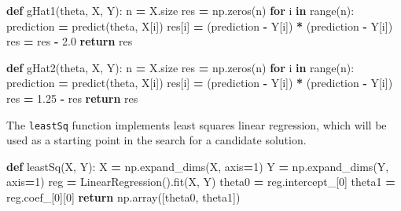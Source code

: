 \documentclass[12pt, twoside]{amherstthesis}
\newenvironment{Shaded}{\begin{snugshade}}{\end{snugshade}}
\newcommand{\BuiltInTok}[1]{#1}
\newcommand{\ControlFlowTok}[1]{\textcolor[rgb]{0.13,0.29,0.53}{\textbf{#1}}}
\newcommand{\DecValTok}[1]{\textcolor[rgb]{0.00,0.00,0.81}{#1}}
\newcommand{\FloatTok}[1]{\textcolor[rgb]{0.00,0.00,0.81}{#1}}
\newcommand{\KeywordTok}[1]{\textcolor[rgb]{0.13,0.29,0.53}{\textbf{#1}}}
\newcommand{\NormalTok}[1]{#1}
\newcommand{\OperatorTok}[1]{\textcolor[rgb]{0.81,0.36,0.00}{\textbf{#1}}}
\begin{document}
\begin{Shaded}
\begin{Highlighting}[]
\KeywordTok{def}\NormalTok{ gHat1(theta, X, Y):}
\NormalTok{    n }\OperatorTok{=}\NormalTok{ X.size          }
\NormalTok{    res }\OperatorTok{=}\NormalTok{ np.zeros(n)   }
    \ControlFlowTok{for}\NormalTok{ i }\KeywordTok{in} \BuiltInTok{range}\NormalTok{(n):}
\NormalTok{        prediction }\OperatorTok{=}\NormalTok{ predict(theta, X[i])                   }
\NormalTok{        res[i] }\OperatorTok{=}\NormalTok{ (prediction }\OperatorTok{{-}}\NormalTok{ Y[i]) }\OperatorTok{*}\NormalTok{ (prediction }\OperatorTok{{-}}\NormalTok{ Y[i])  }
\NormalTok{    res }\OperatorTok{=}\NormalTok{ res }\OperatorTok{{-}} \FloatTok{2.0}     
    \ControlFlowTok{return}\NormalTok{ res}

\KeywordTok{def}\NormalTok{ gHat2(theta, X, Y):}
\NormalTok{    n }\OperatorTok{=}\NormalTok{ X.size          }
\NormalTok{    res }\OperatorTok{=}\NormalTok{ np.zeros(n)   }
    \ControlFlowTok{for}\NormalTok{ i }\KeywordTok{in} \BuiltInTok{range}\NormalTok{(n):}
\NormalTok{        prediction }\OperatorTok{=}\NormalTok{ predict(theta, X[i])                   }
\NormalTok{        res[i] }\OperatorTok{=}\NormalTok{ (prediction }\OperatorTok{{-}}\NormalTok{ Y[i]) }\OperatorTok{*}\NormalTok{ (prediction }\OperatorTok{{-}}\NormalTok{ Y[i])  }
\NormalTok{    res }\OperatorTok{=} \FloatTok{1.25} \OperatorTok{{-}}\NormalTok{ res   }
    \ControlFlowTok{return}\NormalTok{ res}
\end{Highlighting}
\end{Shaded}
\noindent The \texttt{leastSq} function implements least squares linear regression, which will be used as a starting point in the search for a candidate solution.
\begin{Shaded}
\begin{Highlighting}[]
\KeywordTok{def}\NormalTok{ leastSq(X, Y):}
\NormalTok{    X }\OperatorTok{=}\NormalTok{ np.expand\_dims(X, axis}\OperatorTok{=}\DecValTok{1}\NormalTok{) }
\NormalTok{    Y }\OperatorTok{=}\NormalTok{ np.expand\_dims(Y, axis}\OperatorTok{=}\DecValTok{1}\NormalTok{) }
\NormalTok{    reg }\OperatorTok{=}\NormalTok{ LinearRegression().fit(X, Y)}
\NormalTok{    theta0 }\OperatorTok{=}\NormalTok{ reg.intercept\_[}\DecValTok{0}\NormalTok{]   }
\NormalTok{    theta1 }\OperatorTok{=}\NormalTok{ reg.coef\_[}\DecValTok{0}\NormalTok{][}\DecValTok{0}\NormalTok{]     }
    \ControlFlowTok{return}\NormalTok{ np.array([theta0, theta1])}
\end{Highlighting}
\end{Shaded}
\end{document}
